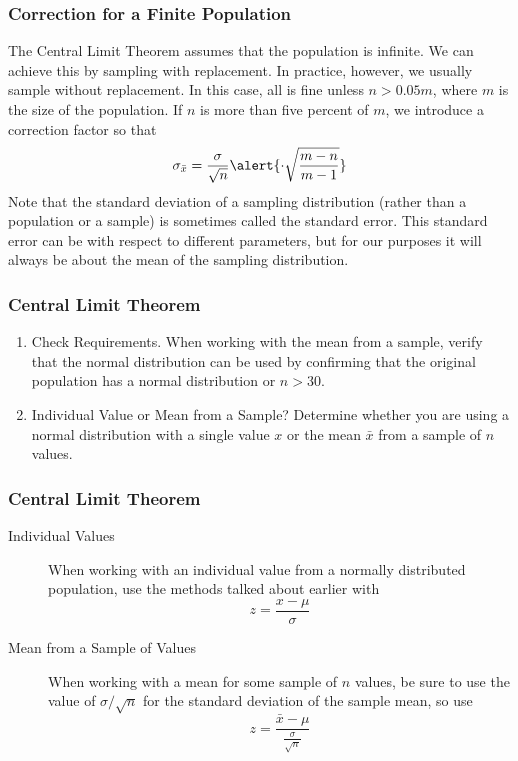 \documentclass[xcolor=dvipsnames]{beamer}
\begin{document}
\begin{frame}
  \frametitle{Correction for a Finite Population}
The Central Limit Theorem assumes that the population is infinite. We
can achieve this by sampling with replacement. In practice, however,
we usually sample without replacement. In this case, all is fine
unless $n>0.05m$, where $m$ is the size of the population. If $n$ is
more than five percent of $m$, we introduce a correction factor so
that
\begin{equation}
  \label{eq:ungeihay}
  \sigma_{\bar{x}}=\frac{\sigma}{\sqrt{n}}\alert{\cdot\sqrt{\frac{m-n}{m-1}}}
\end{equation}
Note that the standard deviation of a sampling distribution (rather
than a population or a sample) is sometimes called the \alert{standard
error}. This standard error can be with respect to different
parameters, but for our purposes it will always be about the mean of
the sampling distribution.
\end{frame}

\begin{frame}
  \frametitle{Central Limit Theorem}
\begin{enumerate}
\item Check Requirements. When working with the mean from a sample,
  verify that the normal distribution can be used by confirming that
  the original population has a normal distribution or $n>30$. 
\item Individual Value or Mean from a Sample? Determine whether you
  are using a normal distribution with a single value $x$ or the mean
  $\bar{x}$ from a sample of $n$ values. 
\end{enumerate}
\end{frame}

\begin{frame}
  \frametitle{Central Limit Theorem}
\begin{description}
\item[Individual Values] When working with an individual value from a
  normally distributed population, use the methods talked about
  earlier with 
  \begin{equation}
    \label{eq:cohseiph}
    z=\frac{x-\mu}{\sigma}
  \end{equation}
\item[Mean from a Sample of Values] When working with a mean for some
  sample of $n$ values, be sure to use the value of $\sigma/\sqrt{n}$
  for the standard deviation of the sample mean, so use
  \begin{equation}
    \label{eq:euruighu}
    z=\frac{\bar{x}-\mu}{\frac{\sigma}{\sqrt{n}}}
  \end{equation}
\end{description}
\end{frame}
\end{document}
